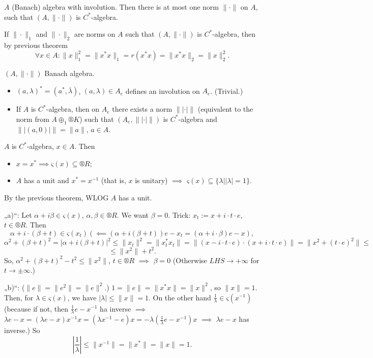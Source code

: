 \documentclass[12pt]{article}					%
\begin{document}
\begin{dusledek}
	$A$ (Banach) algebra with involution. Then there is at most one norm $\|·\|$ on $A$, such that $(A, \|·\|)$ is $C^*$-algebra.

	\begin{dukazin}
		If $\|·\|_1$ and $\|·\|_2$ are norms on $A$ such that $(A, \|·\|)$ is $C^*$-algebra, then by previous theorem
		$$ \forall x \in A: \|x\|_1^2 = \|x^* x\|_1 = r(x^* x) = \|x^* x\|_2 = \|x\|_2^2. $$
	\end{dukazin}
\end{dusledek}

\begin{veta}
	$(A, \|·\|)$ Banach algebra.

	\begin{itemize}
		\item $(a, \lambda)^* = (a^*, \overline{\lambda})$, $(a, \lambda) \in A_e$ defines an involution on $A_e$. (Trivial.)
		\item If $A$ is $C^*$-algebra, then on $A_e$ there exists a norm $\| |·| \|$ (equivalent to the norm from $A \oplus_1 ®K$) such that $(A_e, \| |·| \|)$ is $C^*$-algebra and $\| |(a, 0)| \| = \|a\|$, $a \in A$.
	\end{itemize}
\end{veta}

\begin{veta}
	$A$ is $C^*$-algebra, $x \in A$. Then
	
	\begin{itemize}
		\item $x = x^* \implies ς(x) \subseteq ®R$;
		\item $A$ has a unit and $x^* = x^{-1}$ (that is, $x$ is unitary) $\implies$ $ς(x) \subseteq \{λ | |λ| = 1\}$.
	\end{itemize}

	\begin{dukazin}
		By the previous theorem, WLOG $A$ has a unit.

		„a)“: Let $\alpha + i\beta \in ς(x)$, $\alpha, \beta \in ®R$. We want $\beta = 0$. Trick: $x_t := x + i·t·e$, $t \in ®R$. Then
		$$ \alpha + i·(\beta + t) \in ς(x_t) (\impliedby (\alpha + i(\beta + t))e - x_t = (\alpha + i·\beta)e - x), $$
		$$ \alpha^2 + (\beta + t)^2 = |\alpha + i(\beta + t)|^2 ≤ \|x_t\|^2 = \|x_t^* x_t\| = \|(x - i·t·e)·(x + i·t·e)\| = \|x^2 + (t·e)^2\| ≤ $$
		$$ ≤ \|x^2\| + t^2. $$
		So, $\alpha^2 + (\beta + t)^2 - t^2 ≤ \|x^2\|$, $t \in ®R$ $\implies$ $\beta = 0$ (Otherwise $LHS \rightarrow +∞$ for $t \rightarrow ±∞$.)

		„b)“: ($\|e\| = \|e^2\| = \|e\|^2$.) $1 = \|e\| = \|x^*x\| = \|x\|^2$, so $\|x\| = 1$. Then, for $λ \in ς(x)$, we have $|λ| ≤ \|x\| = 1$. On the other hand $\frac{1}{λ} \in ς(x^{-1})$ (because if not, then $\frac{1}{λ}e - x^{-1}$ ha inverse $\implies$ $λ e - x = (λ e - x)x^{-1}x = (λ x^{-1} - e)x = -λ (\frac{1}{λ}e - x^{-1})x$ $\implies$ $λ e - x$ has inverse.) So
		$$ \left|\frac{1}{λ}\right| ≤ \|x^{-1}\| = \|x^*\| = \|x\| = 1. $$
	\end{dukazin}
\end{veta}
\end{document}

